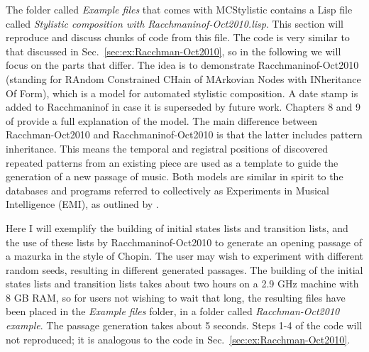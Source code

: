The folder called \emph{Example files} that comes with MCStylistic contains a Lisp file called \emph{Stylistic composition with Racchmaninof-Oct2010.lisp}. This section will reproduce and discuss chunks of code from this file. The code is very similar to that discussed in Sec.~\ref{sec:ex:Racchman-Oct2010}, so in the following we will focus on the parts that differ. The idea is to demonstrate Racchmaninof-Oct2010 (standing for RAndom Constrained CHain of MArkovian Nodes with INheritance Of Form), which is a model for automated stylistic composition. A date stamp is added to Racchmaninof in case it is superseded by future work. Chapters 8 and 9 of \citet{collins2011b} provide a full explanation of the model. The main
difference between Racchman-Oct2010 and
Racchmaninof-Oct2010 is that the latter includes
pattern inheritance. This means the temporal and
registral positions of discovered repeated patterns
from an existing piece are used as a template to 
guide the generation of a new passage of music. Both
models are similar in spirit to the databases and programs referred to collectively as Experiments in Musical Intelligence (EMI), as outlined by \citet*{cope1996,cope2001,cope2005}.

Here I will exemplify the building of initial states lists and transition lists, and the use of these lists by Racchmaninof-Oct2010 to generate an opening passage of a
mazurka in the style of Chopin. %
The user may wish to experiment with different random seeds, resulting in different generated passages. The building of the initial states lists and transition lists takes about two hours on a 2.9 GHz machine
with 8 GB RAM, so for users not wishing to
wait that long, the resulting files have been placed
in the \emph{Example files} folder, in a folder called
\emph{Racchman-Oct2010 example}. The passage generation takes about 5 seconds. Steps 1-4 of the code will not reproduced; it is analogous to the code in Sec.~\ref{sec:ex:Racchman-Oct2010}.

